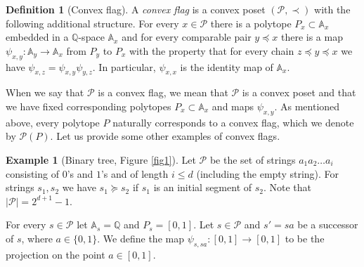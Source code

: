 \documentclass{daj}
\renewcommand{\le}{\leqslant}
\newcommand{\Q}{\mathbb Q}
\newcommand{\A}{\mathbb A}
\renewcommand{\P}{\mathcal P}
\theoremstyle{definition}
\newtheorem{defi}[theorem]{Definition}
\theoremstyle{remark}
\theoremstyle{definition}
\newtheorem{example}[theorem]{Example}
\theoremstyle{definition}
\begin{document}
\begin{defi}[Convex flag] 
A {\em convex flag} is a convex poset $(\P, \prec)$ with the following additional structure.
For every $x \in \P$ there is a polytope $P_x \subset \A_x$ embedded in a $\Q$-space $\A_x$ and for every comparable pair $y \preceq x$ there is a map $\psi_{x, y}: \A_y \rightarrow \A_x$ from $P_y$ to $P_x$ with the property that for every chain $z \preceq y \preceq x$ we have $\psi_{x, z} = \psi_{x, y}\psi_{y, z}$. In particular, $\psi_{x, x}$ is the identity map of $\A_x$.
\end{defi}

When we say that $\P$ is a convex flag, we mean that $\P$ is a convex poset and that we have fixed corresponding polytopes $P_x \subset \A_x$ and maps $\psi_{x, y}$. 
As mentioned above, every polytope $P$ naturally corresponds to a convex flag, which we denote by $\P(P)$. Let us provide some other examples of convex flags.

\begin{example}[Binary tree, Figure \ref{fig1}]\label{ex1}
Let $\P$ be the set of strings $a_1a_2\ldots a_i$ consisting of $0$'s and $1$'s and of length $i \le d$ (including the empty string). For strings $s_1, s_2$ we have $s_1 \succeq s_2$ if $s_1$ is an initial segment of $s_2$. Note that $|\P| = 2^{d+1}-1$. 

For every $s \in \P$ let $\A_s = \Q$ and $P_s = [0, 1]$. Let $s \in \P$ and $s' = s a$ be a successor of $s$, where $a \in \{0, 1\}$. We define the map $\psi_{s, sa}: [0, 1] \rightarrow [0, 1]$ to be the projection on the point $a \in [0, 1]$. 
\end{example}
\end{document}
